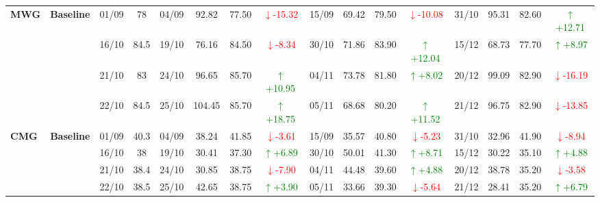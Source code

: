 \documentclass{ieeeaccess}
\begin{document}
{\begin{longtable}{llcc|cccc|cccc|cccc}
\multirow{4}{*}{\textbf{MWG}}
& \textbf{Baseline}
& 01/09 & 78 & 04/09 & 92.82 & 77.50 & \textcolor{red}{\(\downarrow\)-15.32} & 15/09 & 69.42 & 79.50 & \textcolor{red}{\(\downarrow\)-10.08} & 31/10 & 95.31 & 82.60 & \textcolor{green}{\(\uparrow\)+12.71} \\
& & 16/10 & 84.5 & 19/10 & 76.16 & 84.50 & \textcolor{red}{\(\downarrow\)-8.34} & 30/10 & 71.86 & 83.90 & \textcolor{green}{\(\uparrow\)+12.04} & 15/12 & 68.73 & 77.70 & \textcolor{green}{\(\uparrow\)+8.97} \\
& & 21/10 & 83 & 24/10 & 96.65 & 85.70 & \textcolor{green}{\(\uparrow\)+10.95} & 04/11 & 73.78 & 81.80 & \textcolor{green}{\(\uparrow\)+8.02} & 20/12 & 99.09 & 82.90 & \textcolor{red}{\(\downarrow\)-16.19} \\
& & 22/10 & 84.5 & 25/10 & 104.45 & 85.70 & \textcolor{green}{\(\uparrow\)+18.75} & 05/11 & 68.68 & 80.20 & \textcolor{green}{\(\uparrow\)+11.52} & 21/12 & 96.75 & 82.90 & \textcolor{red}{\(\downarrow\)-13.85} \\
\midrule

\multirow{4}{*}{\textbf{CMG}}
& \textbf{Baseline}
& 01/09 & 40.3 & 04/09 & 38.24 & 41.85 & \textcolor{red}{\(\downarrow\)-3.61} & 15/09 & 35.57 & 40.80 & \textcolor{red}{\(\downarrow\)-5.23} & 31/10 & 32.96 & 41.90 & \textcolor{red}{\(\downarrow\)-8.94} \\
& & 16/10 & 38 & 19/10 & 30.41 & 37.30 & \textcolor{green}{\(\uparrow\)+6.89} & 30/10 & 50.01 & 41.30 & \textcolor{green}{\(\uparrow\)+8.71} & 15/12 & 30.22 & 35.10 & \textcolor{green}{\(\uparrow\)+4.88} \\
& & 21/10 & 38.4 & 24/10 & 30.85 & 38.75 & \textcolor{red}{\(\downarrow\)-7.90} & 04/11 & 44.48 & 39.60 & \textcolor{green}{\(\uparrow\)+4.88} & 20/12 & 38.78 & 35.20 & \textcolor{red}{\(\downarrow\)-3.58} \\
& & 22/10 & 38.5 & 25/10 & 42.65 & 38.75 & \textcolor{green}{\(\uparrow\)+3.90} & 05/11 & 33.66 & 39.30 & \textcolor{red}{\(\downarrow\)-5.64} & 21/12 & 28.41 & 35.20 & \textcolor{green}{\(\uparrow\)+6.79} \\
\midrule


\end{longtable}}
\end{document}
